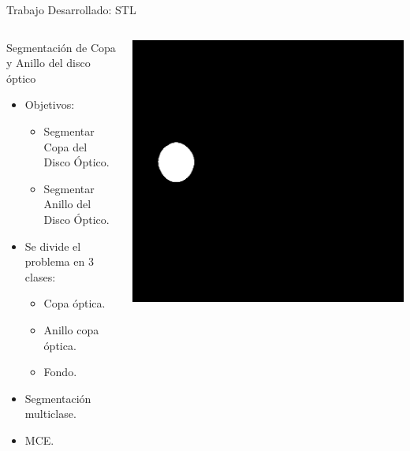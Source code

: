 \documentclass[xcolor=dvipsnames,table]{beamer}
\begin{document}
\begin{frame}{Trabajo Desarrollado: STL}
	\begin{columns}[T]
		\vspace{-0.5cm} %
		\begin{block}{Segmentación de Copa y Anillo del disco óptico}
			\begin{itemize}
				\item Objetivos:
					\begin{itemize}
						\item Segmentar Copa del Disco Óptico.
						\item Segmentar Anillo del Disco Óptico.
					\end{itemize}
					\item Se divide el problema en 3 clases:
					\begin{itemize}
						\item Copa óptica.
						\item Anillo copa óptica.
						\item Fondo.
					\end{itemize}
					\item Segmentación multiclase.
				\item MCE.
			\end{itemize}
		\end{block}
	\begin{minipage}[t]{0.35\textwidth}
		\centering
		\includegraphics[width=\textwidth]{my_images/ML/n0109_disc.png}\\[1ex]

\end{minipage}
\end{columns}
\end{frame}
\end{document}
